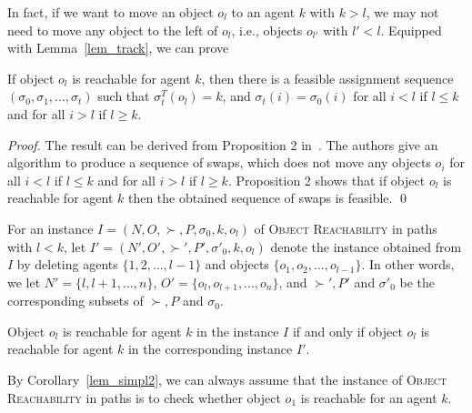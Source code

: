 In fact, if we want to move an object $o_l$ to an agent $k$ with $k>l$, we may not need to move any object to the left of $o_l$, i.e., objects $o_{l'}$ with $l'<l$. Equipped with Lemma~\ref{lem_track}, we can prove
\begin{lemma}\label{lem_simplifying1}
If object $o_l$ is reachable for agent $k$, then
there is a feasible assignment sequence $(\sigma _0,\sigma _1,\dots,\sigma _t)$ such that
$\sigma^T _t(o_l)=k$, and  $\sigma_t(i)=\sigma_0(i)$ for all $i < l$ if $l\leq k$ and for all $i > l$ if $l\geq k$.
\end{lemma}
\begin{proof}
    The result can be derived from Proposition 2 in~\citep{DBLP:conf/ijcai/GourvesLW17}.
    The authors give an algorithm to produce a sequence of swaps, which does not move any objects $o_i$ for all $i < l$ if $l\leq k$ and for all $i > l$ if $l\geq k$.
    Proposition 2 shows that if object  $o_l$ is reachable for agent $k$ then the obtained sequence of swaps is feasible. \qed
\end{proof}

For an instance $I=(N,O,\succ,P,\sigma _0, k, o_l)$ of \textsc{Object Reachability} in paths
with $l<k$, let $I'=(N',O',\succ', P',\sigma'_0, k, o_l)$ denote the instance obtained from $I$ by deleting agents $\{1,2,\dots, l-1\}$ and objects $\{o_1,o_2,\dots, o_{l-1}\}$.
In other words, we let $N'=\{l,l+1,\dots, n\}$, $O'=\{o_l,o_{l+1},\dots, o_n\}$,
and $\succ', P'$ and $\sigma'_0$ be the corresponding subsets of $\succ, P$ and $\sigma_0$.



\begin{corollary}
    \label{lem_simpl2}
Object $o_l$ is reachable for agent $k$ in the instance $I$ if and only if object $o_l$ is reachable for agent $k$ in the corresponding instance $I'$.
\end{corollary}


By Corollary~\ref{lem_simpl2}, we can always assume that the instance of \textsc{Object Reachability} in paths
is to check whether object $o_1$ is reachable for an agent $k$.

